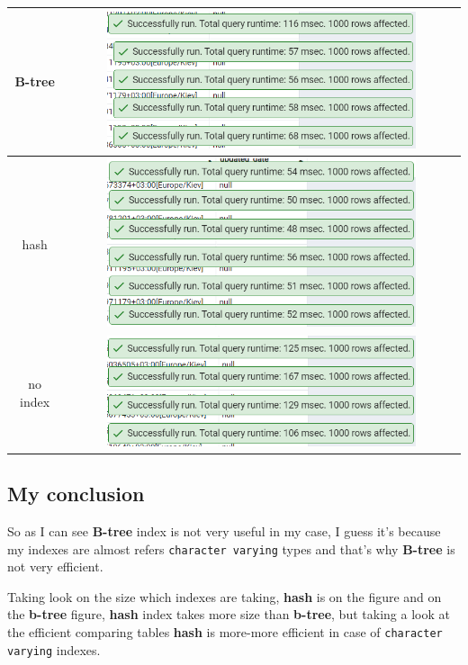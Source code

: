 \begin{center}
    \begin{tabular}{ | c | c |}
        \hline
        B-tree   & \includegraphics[width=0.8\textwidth]{images/query_select_user_with_tickets_by_email_like_performance_b_tree}   \\ \hline
        hash     & \includegraphics[width=0.8\textwidth]{images/query_select_user_with_tickets_by_email_like_performance_hash}     \\ \hline
        no index & \includegraphics[width=0.8\textwidth]{images/query_select_user_with_tickets_by_email_like_performance_no_index} \\ \hline
    \end{tabular}
\end{center}

\subsection{My conclusion}\label{subsec:my-conclusion}

So as I can see \textbf{B-tree} index is not very useful in my case, I guess it's because
my indexes are almost refers \texttt{character varying} types and that's why \textbf{B-tree} is
not very efficient.

Taking look on the size which indexes are taking, \textbf{hash} is on the figure and on the \textbf{b-tree} figure,
\textbf{hash} index takes more size than \textbf{b-tree}, but taking a look at the efficient comparing tables
\textbf{hash} is more-more efficient in case of \texttt{character varying} indexes.
